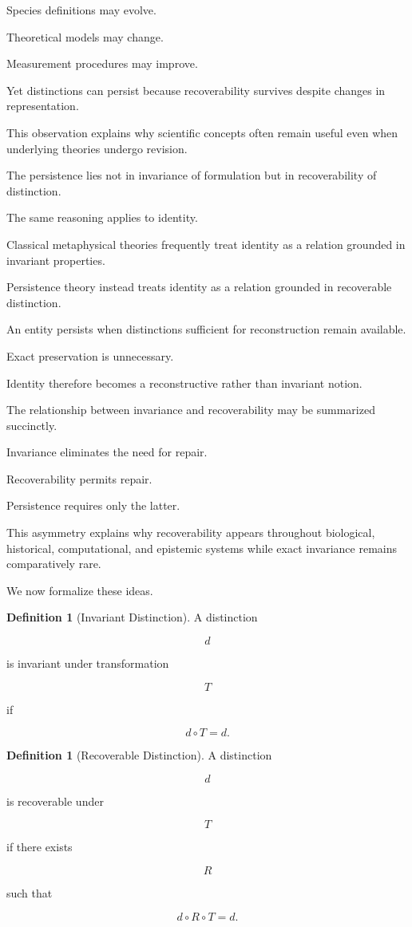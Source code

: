 \documentclass[12pt,oneside]{article}
\theoremstyle{definition}
\newtheorem{definition}[theorem]{Definition} \newtheorem{axiom}[theorem]{Axiom} \newtheorem{remark}[theorem]{Remark} \newtheorem{example}[theorem]{Example}
\begin{document}
Species definitions may evolve.

Theoretical models may change.

Measurement procedures may improve.

Yet distinctions can persist because recoverability survives despite changes in representation.

This observation explains why scientific concepts often remain useful even when underlying theories undergo revision.

The persistence lies not in invariance of formulation but in recoverability of distinction.

The same reasoning applies to identity.

Classical metaphysical theories frequently treat identity as a relation grounded in invariant properties.

Persistence theory instead treats identity as a relation grounded in recoverable distinction.

An entity persists when distinctions sufficient for reconstruction remain available.

Exact preservation is unnecessary.

Identity therefore becomes a reconstructive rather than invariant notion.

The relationship between invariance and recoverability may be summarized succinctly.

Invariance eliminates the need for repair.

Recoverability permits repair.

Persistence requires only the latter.

This asymmetry explains why recoverability appears throughout biological, historical, computational, and epistemic systems while exact invariance remains comparatively rare.

We now formalize these ideas.

\begin{definition}[Invariant Distinction]

A distinction

\[
d
\]

is invariant under transformation

\[
T
\]

if

\[
d\circ T
=
d.
\]

\end{definition}

\begin{definition}[Recoverable Distinction]

A distinction

\[
d
\]

is recoverable under

\[
T
\]

if there exists

\[
R
\]

such that

\[
d\circ R\circ T
=
d.
\]

\end{definition}
\end{document}
